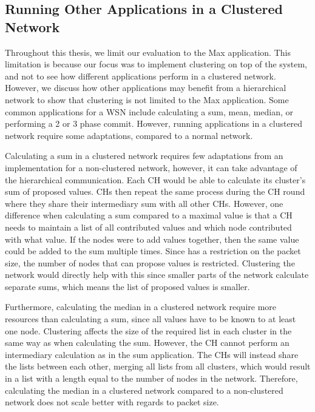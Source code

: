 \subsection{Running Other Applications in a Clustered Network}
\label{subsec:discuss-other-apps}
\begin{newtext}
Throughout this thesis, we limit our evaluation to the Max application. This limitation is because our focus was to implement clustering on top of the \atwo{} system, and not to see how different applications perform in a clustered network. However, we discuss how other applications may benefit from a hierarchical network to show that clustering is not limited to the Max application. Some common applications for a WSN include calculating a sum, mean, median, or performing a 2 or 3 phase commit. However, running applications in a clustered network require some adaptations, compared to a normal network.

Calculating a sum in a clustered network requires few adaptations from an implementation for a non-clustered network, however, it can take advantage of the hierarchical communication. Each CH would be able to calculate its cluster's sum of proposed values. CHs then repeat the same process during the CH round where they share their intermediary sum with all other CHs. However, one difference when calculating a sum compared to a maximal value is that a CH needs to maintain a list of all contributed values and which node contributed with what value. If the nodes were to add values together, then the same value could be added to the sum multiple times. Since \atwo{} has a restriction on the packet size, the number of nodes that can propose values is restricted. Clustering the network would directly help with this since smaller parts of the network calculate separate sums, which means the list of proposed values is smaller.

Furthermore, calculating the median in a clustered network require more resources than calculating a sum, since all values have to be known to at least one node. Clustering affects the size of the required list in each cluster in the same way as when calculating the sum. However, the CH cannot perform an intermediary calculation as in the sum application. The CHs will instead share the lists between each other, merging all lists from all clusters, which would result in a list with a length equal to the number of nodes in the network. Therefore, calculating the median in a clustered network compared to a non-clustered network does not scale better with regards to packet size.


\end{newtext}
